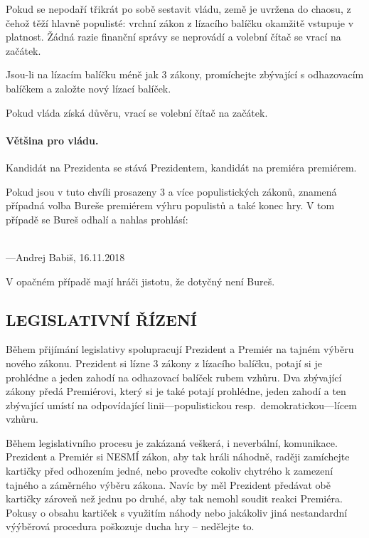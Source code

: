 \documentclass{article}
\newenvironment{redbox}{
    \color{red}\it
}
{
    \normalsize
}
\begin{document}
            Pokud se nepodaří třikrát po sobě sestavit vládu, země je uvržena do chaosu, z čehož těží hlavně populisté: vrchní zákon z lízacího balíčku okamžitě vstupuje v platnost. Žádná razie finanční správy se neprovádí a volební čítač se vrací na začátek.

            Jsou-li na lízacím balíčku méně jak $3$ zákony, promíchejte zbývající s odhazovacím balíčkem a založte nový lízací balíček.

            Pokud vláda získá důvěru, vrací se volební čítač na začátek.

            \paragraph{Většina pro vládu.} Kandidát na Prezidenta se stává Prezidentem, kandidát na premiéra pre\-mié\-rem.

            Pokud jsou v tuto chvíli prosazeny $3$ a více populistických zákonů, znamená případná volba Bureše premiérem výhru populistů a také konec hry. V tom případě se Bureš odhalí a nahlas prohlásí:

            \begin{redbox}
                \Large
                \\[.5em]
                \normalsize
                \null\hfill
                ---Andrej Babiš, 16.11.2018
            \end{redbox}

            V opačném případě mají hráči jistotu, že dotyčný není Bureš.

    \subsection*{LEGISLATIVNÍ ŘÍZENÍ}

        Během přijímání legislativy spolupracují Prezident a Premiér na tajném výběru nového zákonu. Prezident si lízne $3$ zákony z lízacího balíčku, potají si je prohlédne a jeden zahodí na odhazovací balíček rubem vzhůru. Dva zbývající zákony předá Premiérovi, který si je také potají prohlédne, jeden zahodí a ten zbývající umístí na odpovídající linii---populistickou resp.\ de\-mo\-kra\-tic\-kou---lícem vzhůru.

        Během legislativního procesu je zakázaná veš\-ke\-rá, i neverbální, komunikace. Prezident a Premiér si NESMÍ  zákon, aby tak hráli náhodně, raději zamíchejte kartičky před odhozením jedné, nebo proveďte cokoliv chytrého k zamezení tajného a záměrného výběru zákona.
        Navíc by měl Prezident předávat obě kartičky zároveň než jednu po druhé, aby tak nemohl soudit reakci Premiéra.
        Pokusy o  obsahu kartiček s využitím náhody nebo jakákoliv jiná nestandardní výýběrová procedura poškozuje ducha hry -- nedělejte to.
\end{document}

